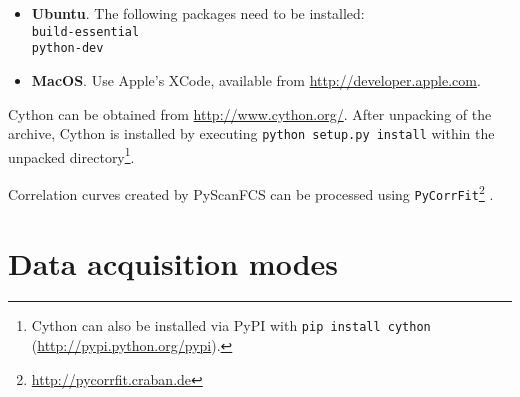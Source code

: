\begin{itemize}
\begin{itemize}
\item[ ] \textbf{Ubuntu}. The following packages need to be installed:
\\
\texttt{build-essential\\
python-dev} 
\item[ ] \textbf{MacOS}. Use Apple's XCode, available from \url{http://developer.apple.com}.
\end{itemize}
Cython can be obtained from \url{http://www.cython.org/}. After unpacking of the archive, Cython is installed by executing \texttt{python setup.py install} within the unpacked directory\footnote{Cython can also be installed via PyPI with \texttt{pip install cython} (\url{http://pypi.python.org/pypi}).}.
\end{itemize}

Correlation curves created by PyScanFCS can be processed using \texttt{PyCorrFit}\footnote{\url{http://pycorrfit.craban.de}} \cite{Mueller2014a}.

\newpage
\section{Data acquisition modes}

